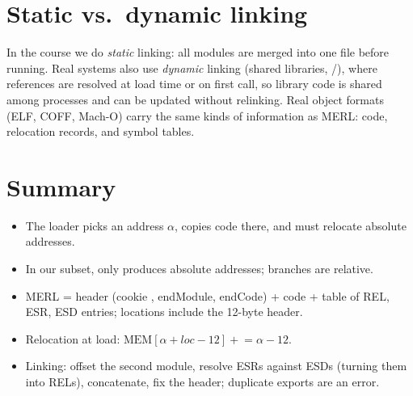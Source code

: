 \section{Static vs.\ dynamic linking}
\begin{aside}
In the course we do \emph{static} linking: all modules are merged into one file before
running. Real systems also use \emph{dynamic} linking (shared libraries, /),
where references are resolved at load time or on first call, so library code is shared among
processes and can be updated without relinking. Real object formats (ELF, COFF, Mach-O) carry
the same kinds of information as MERL: code, relocation records, and symbol tables.
\end{aside}

\section{Summary}
\begin{itemize}
  \item The loader picks an address $\alpha$, copies code there, and must relocate absolute addresses.
  \item In our subset, only  produces absolute addresses; branches are relative.
  \item MERL = header (cookie , endModule, endCode) + code + table of REL,
        ESR, ESD entries; locations include the 12-byte header.
  \item Relocation at load: $\mathrm{MEM}[\alpha+\mathit{loc}-12] \mathrel{+}= \alpha-12$.
  \item Linking: offset the second module, resolve ESRs against ESDs (turning them into RELs),
        concatenate, fix the header; duplicate exports are an error.
\end{itemize}
